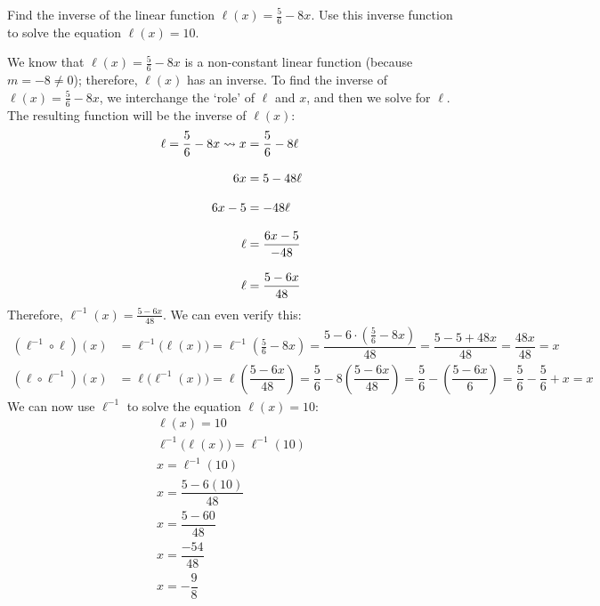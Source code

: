 \documentclass[11pt,letterpaper]{article}
\begin{document}

 Find the inverse of the linear function $\ell(x)= \frac{5}{6} - 8x$. Use this inverse function to solve the equation $\ell(x)= 10$. \pspace

\sol We know that $\ell(x)= \frac{5}{6} - 8x$ is a non-constant linear function (because $m= -8 \neq 0$); therefore, $\ell(x)$ has an inverse. To find the inverse of $\ell(x)= \frac{5}{6} - 8x$, we interchange the `role' of $\ell$ and $x$, and then we solve for $\ell$. The resulting function will be the inverse of $\ell(x)$:
	\[
	\begin{aligned}
	\ell= \frac{5}{6} - 8x \rightsquigarrow x&= \frac{5}{6} - 8\ell \\[0.3cm]
	6x&= 5 - 48\ell \\[0.3cm]
	6x - 5&= -48\ell \\[0.3cm]
	\ell&= \dfrac{6x - 5}{-48} \\[0.3cm]
	\ell&= \dfrac{5 - 6x}{48}
	\end{aligned}
	\]
Therefore, $\ell^{-1}(x)= \frac{5 - 6x}{48}$. We can even verify this:
	\[
	\begin{aligned}
	(\ell^{-1} \circ \ell)(x)&= \ell^{-1} \big(\ell(x) \big)= \ell^{-1} \left( \frac{5}{6} - 8x \right)= \dfrac{5 - 6 \cdot \left( \frac{5}{6} - 8x \right)}{48}= \dfrac{5 - 5 + 48x}{48}= \dfrac{48x}{48}= x \\[0.3cm]
	(\ell \circ \ell^{-1})(x)&= \ell \big( \ell^{-1}(x) \big)= \ell \left( \dfrac{5 - 6x}{48}\right)= \dfrac{5}{6} - 8 \left( \dfrac{5 - 6x}{48} \right)= \dfrac{5}{6} - \left( \dfrac{5 - 6x}{6} \right)= \dfrac{5}{6} - \dfrac{5}{6} + x= x
	\end{aligned}
	\]
We can now use $\ell^{-1}$ to solve the equation $\ell(x)= 10$:
	\[
	\begin{gathered}
	\ell(x)= 10 \\[0.3cm]
	\ell^{-1}\big( \ell(x) \big)= \ell^{-1}(10) \\[0.3cm]
	x= \ell^{-1}(10) \\[0.3cm]
	x= \dfrac{5 - 6(10)}{48} \\[0.3cm]
	x= \dfrac{5 - 60}{48} \\[0.3cm]
	x= \dfrac{-54}{48} \\[0.3cm]
	x= -\dfrac{9}{8}
	\end{gathered}
	\]



\newpage
\end{document}
